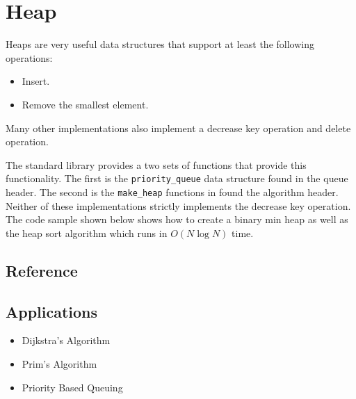 \section{Heap}
Heaps are very useful data structures that support at least the following operations:

\begin{itemize}
	\item Insert.
	\item Remove the smallest element.
\end{itemize}

Many other implementations also implement a decrease key operation and delete operation.

The standard library provides a two sets of functions that provide this functionality.
The first is the \lstinline{priority_queue} data structure found in the queue header.
The second is the \lstinline{make_heap} functions in found the algorithm header.
Neither of these implementations strictly implements the decrease key operation.
The code sample shown below shows how to create a binary min heap as well as the heap sort algorithm which runs in $O(N \log N)$ time.

\subsection{Reference}

\subsection{Applications}
\begin{itemize}
	\item Dijkstra's Algorithm
	\item Prim's Algorithm
	\item Priority Based Queuing
\end{itemize}
